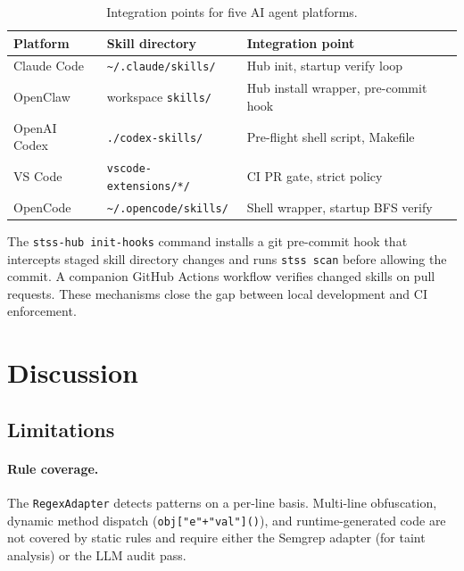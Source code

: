 \documentclass[11pt,twocolumn]{article}
\begin{document}
\begin{table}[t]
\centering
\caption{Integration points for five AI agent platforms.}
\label{tab:platforms}
\renewcommand{\arraystretch}{1.1}
\scriptsize
\begin{tabular}{p{1.7cm}p{2.8cm}p{2.0cm}}
\toprule
\textbf{Platform} & \textbf{Skill directory} & \textbf{Integration point} \\
\midrule
Claude Code  & \texttt{\textasciitilde/.claude/skills/}  & Hub init, startup verify loop \\
OpenClaw     & workspace \texttt{skills/}  & Hub install wrapper, pre-commit hook \\
OpenAI Codex & \texttt{./codex-skills/}  & Pre-flight shell script, Makefile \\
VS Code & \texttt{vscode-extensions/*/} & CI PR gate, strict policy \\
OpenCode & \texttt{\textasciitilde/.opencode/skills/} & Shell wrapper, startup BFS verify \\
\bottomrule
\end{tabular}
\end{table}

The \texttt{stss-hub init-hooks} command installs a git pre-commit hook
that intercepts staged skill directory changes and runs \texttt{stss scan}
before allowing the commit. A companion GitHub Actions workflow verifies
changed skills on pull requests. These mechanisms close the gap between
local development and CI enforcement.

\section{Discussion}
\label{sec:discussion}

\subsection{Limitations}

\paragraph{Rule coverage.} The \texttt{RegexAdapter} detects patterns on a
per-line basis. Multi-line obfuscation, dynamic method dispatch
(\texttt{obj["e"+"val"]()}), and runtime-generated code are not covered by
static rules and require either the Semgrep adapter (for taint analysis) or
the LLM audit pass.
\end{document}
